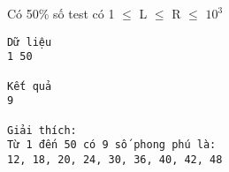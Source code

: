 Có 50\% số test có 1  $\le$  L  $\le$  R  $\le$  $10^{3}$
\begin{verbatim}
Dữ liệu
1 50

Kết quả
9

Giải thích:
Từ 1 đến 50 có 9 số phong phú là: 
12, 18, 20, 24, 30, 36, 40, 42, 48
\end{verbatim}